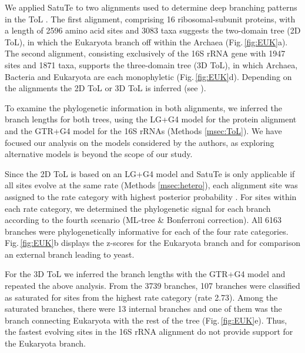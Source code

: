 We applied SatuTe to two alignments used to determine deep branching patterns in the ToL . The first alignment, comprising 16 ribosomal-subunit proteins, with a length of 2596 amino acid sites and 3083 taxa suggests the two-domain tree (2D ToL), in which the Eukaryota branch off within the Archaea (Fig.\,\ref{fig:EUK}a). The second alignment, consisting exclusively of the 16S rRNA gene with 1947 sites and 1871 taxa, supports the three-domain tree (3D ToL), in which Archaea, Bacteria and Eukaryota are each monophyletic (Fig.\,\ref{fig:EUK}d). Depending on the alignments the 2D ToL or 3D ToL is inferred (see ). 

\medskip
To examine the phylogenetic information in both alignments, we  inferred the branch lengths for both trees, using the LG+G4 model for the protein alignment and the GTR+G4 model for the 16S rRNAs (Methods \ref{msec:ToL}). We have focused our analysis on the models considered by the authors, as exploring alternative models is beyond the scope of our study.

\medskip


Since the 2D ToL is based on an LG+G4 model and SatuTe is only applicable if all sites evolve at the same rate (Methods \ref{msec:hetero}), each alignment site was assigned to the rate category with highest posterior probability . For sites within each rate category, we determined the phylogenetic signal for each branch according to the fourth scenario (ML-tree \& Bonferroni correction). All 6163 branches were phylogenetically informative for each of the four rate categories. Fig.\,\ref{fig:EUK}b displays the z-scores for the Eukaryota branch and for comparison an external branch leading to yeast.

\medskip

For the 3D ToL we inferred the branch lengths with the GTR+G4 model and repeated the above analysis. From the 3739 branches, 107 branches were classified as saturated for sites from the highest rate category (rate 2.73). Among the saturated branches, there were 13 internal branches and one of them was the branch connecting Eukaryota with the rest of the tree
(Fig.\,\ref{fig:EUK}e). Thus, the fastest evolving sites in the 16S rRNA alignment do not provide support for the Eukaryota branch.

\medskip

